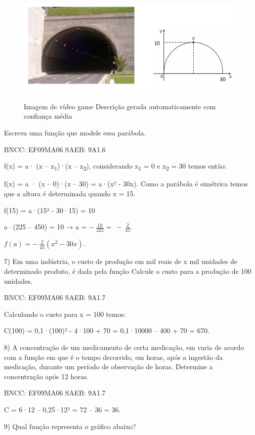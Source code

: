 \begin{escolha}
{{{\begin{escolha}
{{{\begin{figure}
\centering
\includegraphics[width=5.56667in,height=2.24198in]{./_SAEB_9_MAT/media/image143.png}
\caption{Imagem de vídeo game Descrição gerada automaticamente com
confiança média}
\end{figure}

Escreva uma função que modele essa parábola.

BNCC: EF09MA06 SAEB: 9A1.6

f(x) = a· (x -- x\textsubscript{1})·(x -- x\textsubscript{2}),
considerando x\textsubscript{1} = 0 e x\textsubscript{2} = 30 temos
então:

f(x) = a · (x -- 0)·(x -- 30) = a·(x² - 30x). Como a parábola é
simétrica temos que a altura é determinada quando x = 15.

f(15) = a·(15² - 30·15) = 10

a·(225 -- 450) = 10 → a = \(- \ \frac{10}{225} = \  - \ \frac{2}{45}\).

\(f\left( a \right) = - \ \frac{2}{45}(x^{2} - 30x)\).

7) Em uma indústria, o custo de produção em mil reais de x mil unidades
de determinado produto, é dada pela função Calcule o custo para a
produção de 100 unidades.

BNCC: EF09MA06 SAEB: 9A1.7

Calculando o custo para x = 100 temos:

C(100) = 0,1·(100)² - 4·100 + 70 = 0,1·10000 -- 400 + 70 = 670.

8) A concentração de um medicamento de certa medicação, em varia de
acordo com a função em que é o tempo decorrido, em horas, após a
ingestão da medicação, durante um período de observação de horas.
Determine a concentração após 12 horas.

BNCC: EF09MA06 SAEB: 9A1.7

C = 6·12 -- 0,25·12² = 72 -- 36 = 36.

9) Qual função representa o gráfico abaixo?

}}}
\end{escolha}}}}
\end{escolha}
